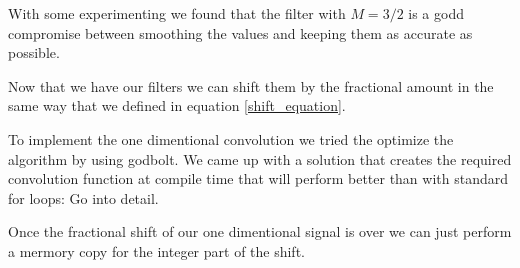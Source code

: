 \documentclass[]{usiinfbachelorproject}
\begin{document}
		With some experimenting we found that the filter with $M=3/2$ is a godd compromise between smoothing the values and keeping them as accurate as possible. 
		
		
		Now that we have our filters we can shift them by the fractional amount in the same way that we defined in equation \ref{shift_equation}.
		
	

	
	
	To implement the one dimentional convolution we tried the optimize the algorithm by using godbolt. We came up with a solution that creates the required convolution function at compile time that will perform better than with standard for loops: Go into detail.
	
	Once the fractional shift of our one dimentional signal is over we can just perform a mermory copy for the integer part of the shift.
	
	
	
	

	
\end{document}
